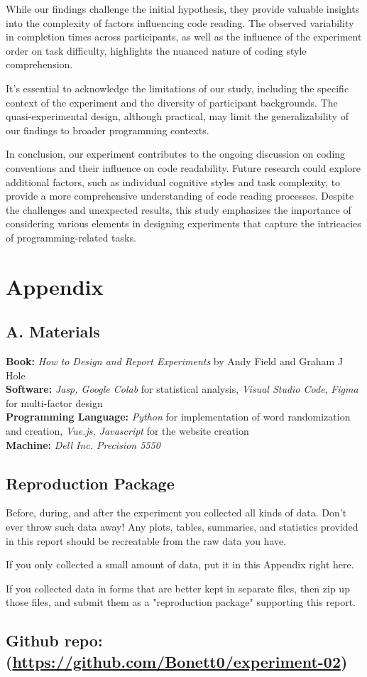 \documentclass{article}
\begin{document}
While our findings challenge the initial hypothesis, they provide valuable insights into the complexity of factors influencing code reading. The observed variability in completion times across participants, as well as the influence of the experiment order on task difficulty, highlights the nuanced nature of coding style comprehension.

It's essential to acknowledge the limitations of our study, including the specific context of the experiment and the diversity of participant backgrounds. The quasi-experimental design, although practical, may limit the generalizability of our findings to broader programming contexts.

In conclusion, our experiment contributes to the ongoing discussion on coding conventions and their influence on code readability. Future research could explore additional factors, such as individual cognitive styles and task complexity, to provide a more comprehensive understanding of code reading processes. Despite the challenges and unexpected results, this study emphasizes the importance of considering various elements in designing experiments that capture the intricacies of programming-related tasks.


\section{Appendix}
\subsection*{A. Materials}
\textbf{Book: } \textit{How to Design and Report Experiments} by Andy Field and Graham J Hole\\
\textbf{Software: } \textit{Jasp, Google Colab} for statistical analysis, \textit{Visual Studio Code}, \textit{Figma} for multi-factor design\\
\textbf{Programming Language: } \textit{Python} for implementation of word randomization and creation,
\textit{Vue.js, Javascript} for the website creation \\
\textbf{Machine: } \textit {Dell Inc. Precision 5550 }

\subsection{Reproduction Package}

Before, during, and after the experiment you collected all kinds of data. Don't ever throw such data away! Any plots, tables, summaries, and statistics provided in this report should be recreatable from the raw data you have.

If you only collected a small amount of data, put it in this Appendix right here.

If you collected data in forms that are better kept in separate files, then zip up those files, and submit them as a "reproduction package" supporting this report.


\subsection*{{Github repo: (\url{https://github.com/Bonett0/experiment-02})}}
\end{document}
